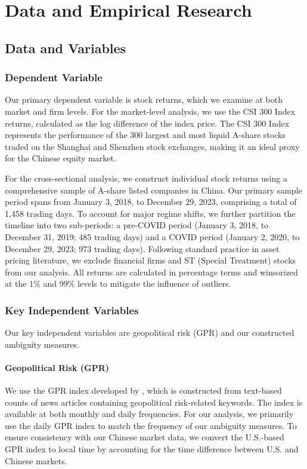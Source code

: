 \documentclass[preprint,12pt,authoryear]{elsarticle}
\begin{document}
\section{Data and Empirical Research}
\label{sec:data}

\subsection{Data and Variables}

\subsubsection{Dependent Variable}

Our primary dependent variable is stock returns, which we examine at both market and firm levels. For the market-level analysis, we use the CSI 300 Index returns, calculated as the log difference of the index price. The CSI 300 Index represents the performance of the 300 largest and most liquid A-share stocks traded on the Shanghai and Shenzhen stock exchanges, making it an ideal proxy for the Chinese equity market.

For the cross-sectional analysis, we construct individual stock returns using a comprehensive sample of A-share listed companies in China.  Our primary sample period spans from January 3, 2018, to December 29, 2023, comprising a total of 1,458 trading days. To account for major regime shifts, we further partition the timeline into two sub-periods: a pre-COVID period (January 3, 2018, to December 31, 2019; 485 trading days) and a COVID period (January 2, 2020, to December 29, 2023; 973 trading days). Following standard practice in asset pricing literature, we exclude financial firms and ST (Special Treatment) stocks from our analysis. All returns are calculated in percentage terms and winsorized at the 1\% and 99\% levels to mitigate the influence of outliers.



\subsubsection{Key Independent Variables}

Our key independent variables are geopolitical risk (GPR) and our constructed ambiguity measures.

\paragraph{Geopolitical Risk (GPR)}
We use the GPR index developed by \citet{Caldara2022}, which is constructed from text-based counts of news articles containing geopolitical risk-related keywords. The index is available at both monthly and daily frequencies. For our analysis, we primarily use the daily GPR index to match the frequency of our ambiguity measures. To ensure consistency with our Chinese market data, we convert the U.S.-based GPR index to local time by accounting for the time difference between U.S. and Chinese markets.
\end{document}
